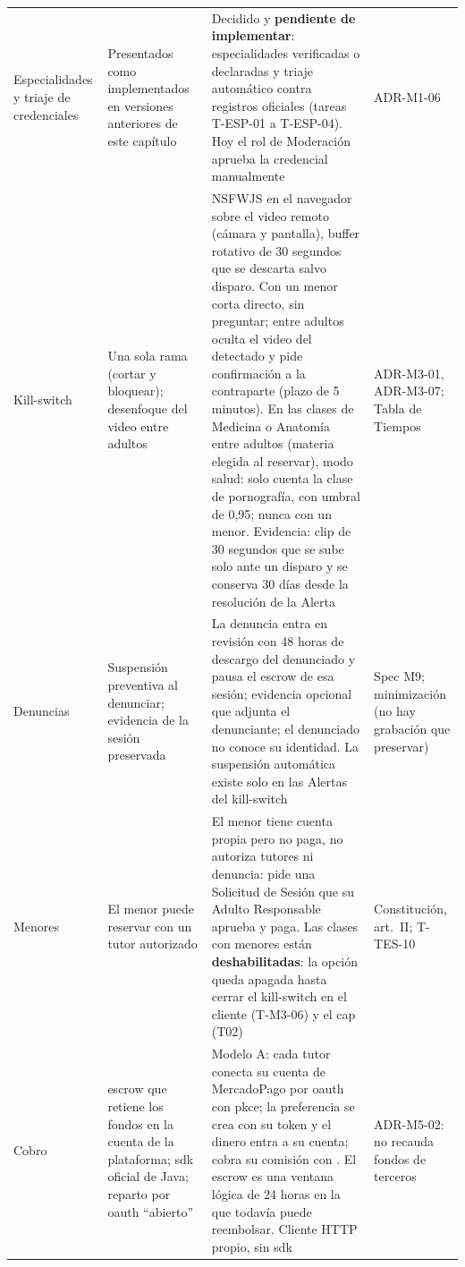 {\begin{xltabular}{\textwidth}{>{\raggedright\arraybackslash}p{2.6cm} >{\raggedright\arraybackslash}p{3.1cm} L >{\raggedright\arraybackslash}p{2.3cm}}
    Especialidades y triaje de credenciales & Presentados como implementados en versiones anteriores de este capítulo & Decidido y \textbf{pendiente de implementar}: especialidades verificadas o declaradas y triaje automático contra registros oficiales (tareas T-ESP-01 a T-ESP-04). Hoy el rol de Moderación aprueba la credencial manualmente & ADR-M1-06 \\
    Kill-switch & Una sola rama (cortar y bloquear); desenfoque del video entre adultos & NSFWJS en el navegador sobre el video remoto (cámara y pantalla), buffer rotativo de 30 segundos que se descarta salvo disparo. Con un menor corta directo, sin preguntar; entre adultos oculta el video del detectado y pide confirmación a la contraparte (plazo de 5 minutos). En las clases de Medicina o Anatomía entre adultos (materia elegida al reservar), modo salud: solo cuenta la clase de pornografía, con umbral de 0,95; nunca con un menor. Evidencia: clip de 30 segundos que se sube solo ante un disparo y se conserva 30 días desde la resolución de la Alerta & ADR-M3-01, ADR-M3-07; Tabla de Tiempos \\
    Denuncias & Suspensión preventiva al denunciar; evidencia de la sesión preservada & La denuncia entra en revisión con 48 horas de descargo del denunciado y pausa el \gls{escrow} de esa sesión; evidencia opcional que adjunta el denunciante; el denunciado no conoce su identidad. La suspensión automática existe solo en las Alertas del kill-switch & Spec M9; minimización (no hay grabación que preservar) \\
    Menores & El menor puede reservar con un tutor autorizado & El menor tiene cuenta propia pero no paga, no autoriza tutores ni denuncia: pide una Solicitud de Sesión que su Adulto Responsable aprueba y paga. Las clases con menores están \textbf{deshabilitadas}: la opción  queda apagada hasta cerrar el kill-switch en el cliente (T-M3-06) y el \gls{cap} (T02) & Constitución, art.~II; T-TES-10 \\
    Cobro & \gls{escrow} que retiene los fondos en la cuenta de la plataforma; \gls{sdk} oficial de Java; reparto por \gls{oauth} ``abierto'' & Modelo A: cada tutor conecta su cuenta de MercadoPago por \gls{oauth} con \gls{pkce}; la preferencia se crea con su token y el dinero entra a su cuenta; \sistema{} cobra su comisión con . El \gls{escrow} es una ventana lógica de 24 horas en la que \sistema{} todavía puede reembolsar. Cliente HTTP propio, sin \gls{sdk} & ADR-M5-02: \sistema{} no recauda fondos de terceros \\

\end{xltabular}}
